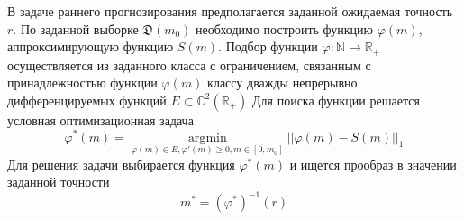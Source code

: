\documentclass[12pt, twoside]{article}
\begin{document}

В задаче раннего прогнозирования предполагается заданной ожидаемая точность $r$. По заданной выборке $\mathfrak{D}(m_0)$ необходимо построить функцию $\varphi(m)$, аппроксимирующую функцию $S(m)$. Подбор функции $\varphi: \mathbb{N} \rightarrow \mathbb{R}_+$ осуществляется из заданного класса с ограничением, связанным с принадлежностью функции $\varphi(m)$ классу дважды непрерывно дифференцируемых функций $E \subset \mathbb{C}^2(\mathbb{R}_+)$ Для поиска функции решается условная оптимизационная задача $$\varphi^*(m) = \underset{\varphi(m) \in E, \varphi'(m) \geq 0, m \in [0, m_0]}{\text{arg} \min} ||\varphi(m) - S(m)||_1$$ Для решения задачи выбирается функция $\varphi^*(m)$ и ищется прообраз в значении заданной точности $$m^* = (\varphi^*)^{-1}(r)$$


\end{document}
